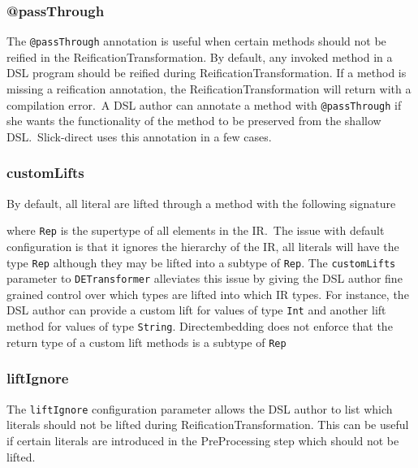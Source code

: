 \subsubsection{@passThrough} %
\label{sub:passThrough}
The \texttt{@passThrough} annotation is useful when certain methods should not be reified in the ReificationTransformation.
By default, any invoked method in a DSL program should be reified during ReificationTransformation.
If a method is missing a reification annotation, the ReificationTransformation will return with a compilation error.\
A DSL author can annotate a method with \texttt{@passThrough} if she wants the functionality of the method to be preserved from the shallow DSL.\
Slick-direct uses this annotation in a few cases.

\subsubsection{customLifts} %
\label{sub:customLifts}
By default, all literal are lifted through a method with the following signature

where \texttt{Rep} is the supertype of all elements in the IR.\
The issue with default configuration is that it ignores the hierarchy of the IR, all literals will have the type \texttt{Rep} although they may be lifted into a subtype of \texttt{Rep}.
The \texttt{customLifts} parameter to \texttt{DETransformer} alleviates this issue by giving the DSL author fine grained control over which types are lifted into which IR types.
For instance, the DSL author can provide a custom lift for values of type \texttt{Int} and another lift method for values of type \texttt{String}.
Directembedding does not enforce that the return type of a custom lift methods is a subtype of \texttt{Rep}

\subsubsection{liftIgnore} %
\label{sub:liftIgnore}
The \texttt{liftIgnore} configuration parameter allows the DSL author to list which literals should not be lifted during ReificationTransformation.
This can be useful if certain literals are introduced in the PreProcessing step which should not be lifted.



